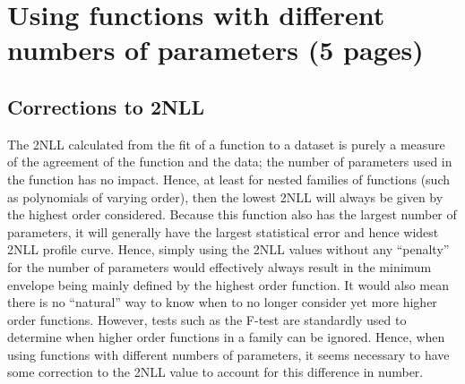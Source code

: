 \section{Using functions with different numbers of parameters (5 pages)}
\label{sec:correction}

\subsection{Corrections to 2NLL}
\label{sec:correction:corrections}

The 2NLL calculated from the fit of a function to a dataset is purely a measure
of the agreement of the function and the data; the number of parameters
used in the function has no impact. Hence, at least for nested families of
functions (such as polynomials of varying order), then the lowest 2NLL will
always be given by the highest order considered.
Because this function also has the
largest number of parameters, it will generally have the largest statistical
error and hence widest 2NLL profile curve.
Hence, simply using the 2NLL values
without any ``penalty'' for the number of parameters would effectively
always result in the minimum envelope being mainly defined by the highest
order function. It would also mean there is no ``natural'' way to know when
to no longer consider yet more higher order functions. However, tests such as
the F-test are standardly used to determine when higher order functions in
a family can be ignored. Hence, when using functions with different
numbers of parameters, it seems necessary to have some correction to the 2NLL
value to account for this difference in number.

